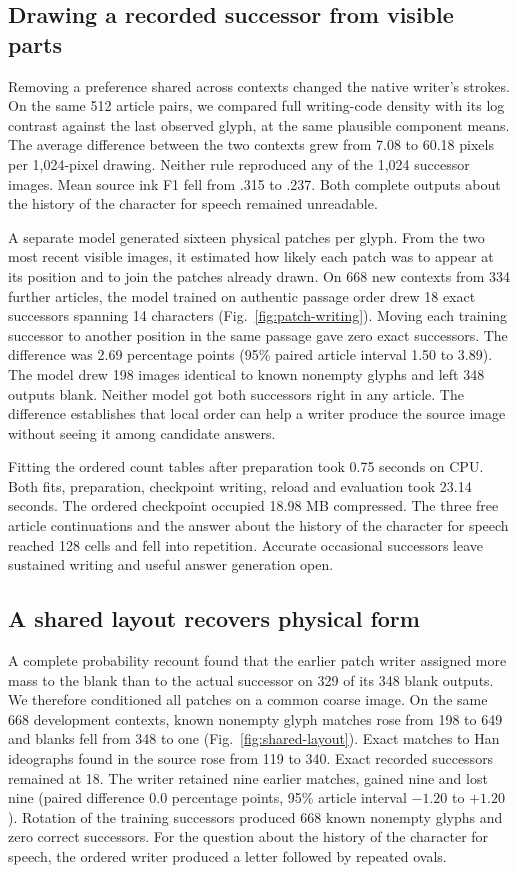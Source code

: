 \documentclass[12pt,a4paper]{article}
\providecommand{\DIFadd}[1]{{\protect\color{blue} \sf #1}} %
\begin{document}
\subsection*{\DIFadd{Drawing a recorded successor from visible parts}}
\DIFadd{Removing a preference shared across contexts changed the native writer's
strokes. On the same 512 article pairs, we compared full writing-code density
with its log contrast against the last observed glyph, at the same plausible
component means. The average difference between the two contexts grew from
7.08 to 60.18 pixels per 1,024-pixel drawing. Neither rule reproduced any of
the 1,024 successor images. Mean source ink F1 fell from .315 to .237.
Both complete outputs about the history of the character for speech remained
unreadable.
}

\DIFadd{A separate model generated sixteen physical patches per glyph. From the two
most recent visible images, it estimated how likely each patch was to appear
at its position and to join the patches already drawn. On 668 new contexts
from 334 further articles, the model trained on authentic passage order drew
18 exact successors spanning 14 characters (Fig.~\ref{fig:patch-writing}).
Moving each training successor to another position in the same passage gave
zero exact successors. The difference was 2.69 percentage points (95\%
paired article interval 1.50 to 3.89). The model drew 198 images identical
to known nonempty glyphs and left 348 outputs blank. Neither model got both
successors right in any article. The difference establishes that local order
can help a writer produce the source image without seeing it among candidate
answers.
}

\DIFadd{Fitting the ordered count tables after preparation took 0.75 seconds on CPU.
Both fits, preparation, checkpoint writing, reload and evaluation took 23.14
seconds. The ordered checkpoint occupied 18.98 MB compressed. The three free
article continuations and the answer about the history of the character for
speech reached 128 cells and fell into repetition. Accurate occasional
successors leave sustained writing and useful answer generation open.
}

\subsection*{\DIFadd{A shared layout recovers physical form}}
\DIFadd{A complete probability recount found that the earlier patch writer assigned
more mass to the blank than to the actual successor on 329 of its 348 blank
outputs. We therefore conditioned all patches on a common coarse image.
On the same 668 development contexts, known nonempty glyph matches rose from
198 to 649 and blanks fell from 348 to one (Fig.~\ref{fig:shared-layout}).
Exact matches to Han ideographs found in the source rose from 119 to 340.
Exact recorded successors remained at 18. The writer retained nine earlier
matches, gained nine and lost nine (paired difference 0.0 percentage points,
95\% article interval $-1.20$ to $+1.20$). Rotation of the training
successors produced 668 known nonempty glyphs and zero correct successors.
For the question about the history of the character for speech, the ordered
writer produced a letter followed by repeated ovals.
}
\end{document}
